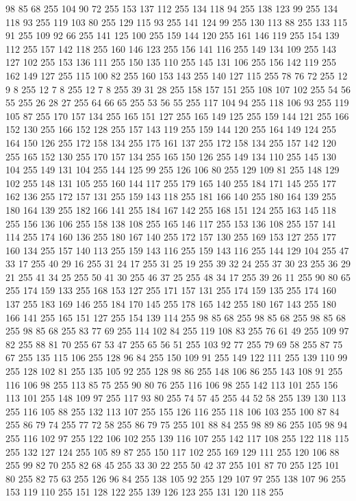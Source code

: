 98 85 68 255 104 90 72 255 153 137 112 255 134 118 94 255 138 123 99 255 134 118 93 255 119 103 80 255 129 115 93 255 141 124 99 255 130 113 88 255 133 115 91 255 109 92 66 255 141 125 100 255 159 144 120 255 161 146 119 255 154 139 112 255 157 142 118 255 160 146 123 255 156 141 116 255 149 134 109 255 143 127 102 255 153 136 111 255 150 135 110 255 145 131 106 255 156 142 119 255 162 149 127 255 115 100 82 255 160 153 143 255 140 127 115 255 78 76 72 255 12 9 8 255 12 7 8 255 12 7 8 255 39 31 28 255 158 157 151 255 108 107 102 255 54 56 55 255 26 28 27 255 64 66 65 255 53 56 55 255 117 104 94 255 118 106 93 255 119 105 87 255 170 157 134 255 165 151 127 255 165 149 125 255 159 144 121 255 166 152 130 255 166 152 128 255 157 143 119 255 159 144 120 255 164 149 124 255 164 150 126 255 172 158 134 255 175 161 137 255 172 158 134 255 157 142 120 255 165 152 130 255 170 157 134 255 165 150 126 255 149 134 110 255 145 130 104 255 149 131 104 255 144 125 99 255
126 106 80 255 129 109 81 255 148 129 102 255 148 131 105 255 160 144 117 255 179 165 140 255 184 171 145 255 177 162 136 255 172 157 131 255 159 143 118 255 181 166 140 255 180 164 139 255 180 164 139 255 182 166 141 255 184 167 142 255 168 151 124 255 163 145 118 255 156 136 106 255 158 138 108 255 165 146 117 255 153 136 108 255 157 141 114 255 174 160 136 255 180 167 140 255 172 157 130 255 169 153 127 255 177 160 134 255 157 140 113 255 159 143 116 255 159 143 116 255 144 129 104 255 47 33 17 255 40 29 16 255 31 24 17 255 31 25 19 255 39 32 24 255 37 30 23 255 36 29 21 255 41 34 25 255 50 41 30 255 46 37 25 255 48 34 17 255 39 26 11 255 90 80 65 255 174 159 133 255 168 153 127 255 171 157 131 255 174 159 135 255 174 160 137 255 183 169 146 255 184 170 145 255 178 165 142 255 180 167 143 255 180 166 141 255 165 151 127 255 154 139 114 255 98 85 68 255 98 85 68 255 98 85 68 255 98 85 68 255 83 77 69 255 114 102 84 255 119 108 83 255 76 61 49 255
109 97 82 255 88 81 70 255 67 53 47 255 65 56 51 255 103 92 77 255 79 69 58 255 87 75 67 255 135 115 106 255 128 96 84 255 150 109 91 255 149 122 111 255 139 110 99 255 128 102 81 255 135 105 92 255 128 98 86 255 148 106 86 255 143 108 91 255 116 106 98 255 113 85 75 255 90 80 76 255 116 106 98 255 142 113 101 255 156 113 101 255 148 109 97 255 117 93 80 255 74 57 45 255 44 52 58 255 139 130 113 255 116 105 88 255 132 113 107 255 155 126 116 255 118 106 103 255 100 87 84 255 86 79 74 255 77 72 58 255 86 79 75 255 101 88 84 255 98 89 86 255 105 98 94 255 116 102 97 255 122 106 102 255 139 116 107 255 142 117 108 255 122 118 115 255 132 127 124 255 105 89 87 255 150 117 102 255 169 129 111 255 120 106 88 255 99 82 70 255 82 68 45 255 33 30 22 255 50 42 37 255 101 87 70 255 125 101 80 255 82 75 63 255 126 96 84 255 138 105 92 255 129 107 97 255 138 107 96 255 153 119 110 255 151 128 122 255 139 126 123 255 131 120 118 255
